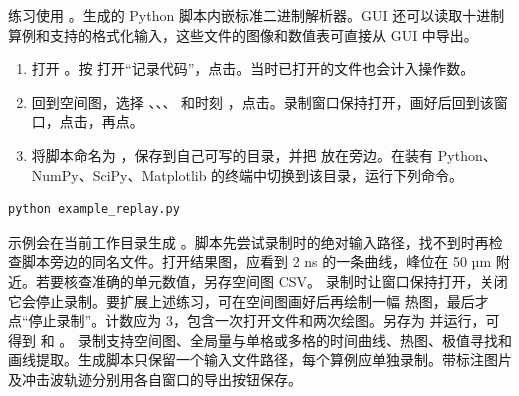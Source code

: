 练习使用 。生成的 Python 脚本内嵌标准二进制解析器。GUI 还可以读取十进制算例和支持的格式化输入，这些文件的图像和数值表可直接从 GUI 中导出。
\begin{enumerate}
\item 打开 。按  打开“记录代码”，点击。当时已打开的文件也会计入操作数。
\item 回到空间图，选择 、、、 和时刻 ，点击。录制窗口保持打开，画好后回到该窗口，点击，再点。
\item 将脚本命名为 ，保存到自己可写的目录，并把  放在旁边。在装有 Python、NumPy、SciPy、Matplotlib 的终端中切换到该目录，运行下列命令。
\end{enumerate}
\begin{verbatim}
python example_replay.py
\end{verbatim}
示例会在当前工作目录生成 。脚本先尝试录制时的绝对输入路径，找不到时再检查脚本旁边的同名文件。打开结果图，应看到 2 ns 的一条曲线，峰位在 50 µm 附近。若要核查准确的单元数值，另存空间图 CSV。
录制时让窗口保持打开，关闭它会停止录制。要扩展上述练习，可在空间图画好后再绘制一幅  热图，最后才点“停止录制”。计数应为 3，包含一次打开文件和两次绘图。另存为  并运行，可得到  和 。
录制支持空间图、全局量与单格或多格的时间曲线、热图、极值寻找和画线提取。生成脚本只保留一个输入文件路径，每个算例应单独录制。带标注图片及冲击波轨迹分别用各自窗口的导出按钮保存。



